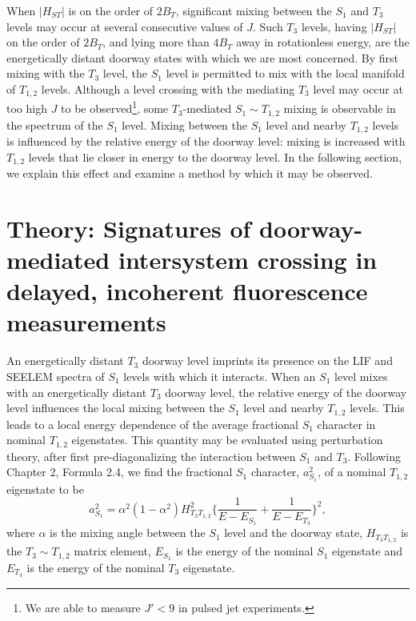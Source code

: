 \documentclass[12pt]{mitthesis}
\begin{document}
When $\lvert H_{ST} \rvert$ is on the order of $2B_T$, significant
mixing between the $S_1$ and $T_3$ levels may occur at several
consecutive values of $J$.  Such $T_3$ levels, having $\lvert H_{ST}
\rvert$ on the order of $2B_T$, and lying more than $4B_T$ away in
rotationless energy, are the energetically distant doorway states with
which we are most concerned.  By first mixing with the $T_3$ level,
the $S_1$ level is permitted to mix with the local manifold of
$T_{1,2}$ levels.  Although a level crossing with the mediating $T_3$
level may occur at too high $J$ to be observed\footnote{We are able to
  measure $J' < 9$ in pulsed jet experiments.}, some $T_3$-mediated
$S_1 \sim T_{1,2}$ mixing is observable in the spectrum of the $S_1$
level.  Mixing between the $S_1$ level and nearby $T_{1,2}$ levels is
influenced by the relative energy of the doorway level: mixing is
increased with $T_{1,2}$ levels that lie closer in energy to the
doorway level.  In the following section, we explain this effect and
examine a method by which it may be observed.



























\section{Theory: Signatures of doorway-mediated intersystem crossing
  in delayed, incoherent fluorescence measurements}

An energetically distant $T_3$ doorway level imprints its presence on
the LIF and SEELEM spectra of $S_1$ levels with which it interacts.
When an $S_1$ level mixes with an energetically distant $T_3$ doorway
level, the relative energy of the doorway level influences the local
mixing between the $S_1$ level and nearby $T_{1,2}$ levels.  This
leads to a local energy dependence of the average fractional $S_1$
character in nominal $T_{1,2}$ eigenstates.  This quantity may be
evaluated using perturbation theory, after first pre-diagonalizing the
interaction between $S_1$ and $T_3$.  Following Chapter 2, Formula
2.4, we find the fractional $S_1$ character, $a_{S_1}^2$, of a nominal
$T_{1,2}$ eigenstate to be
\begin{equation}
  \label{eq:ave-s1-char}
    a_{S_1}^2 = 
    \alpha^2 (1-\alpha^2) H_{T_3T_{1,2}}^2
    \biggl \lbrace 
    \frac{1}{E - E_{S_1}} 
    + \frac{1}{E - E_{T_3}} 
    \biggr \rbrace^2,
\end{equation}
where $\alpha$ is the mixing angle between the $S_1$ level and the
doorway state, $H_{T_3T_{1,2}}$ is the $T_3 \sim T_{1,2}$ matrix
element, $E_{S_1}$ is the energy of the nominal $S_1$ eigenstate and
$E_{T_3}$ is the energy of the nominal $T_3$ eigenstate.
\end{document}
